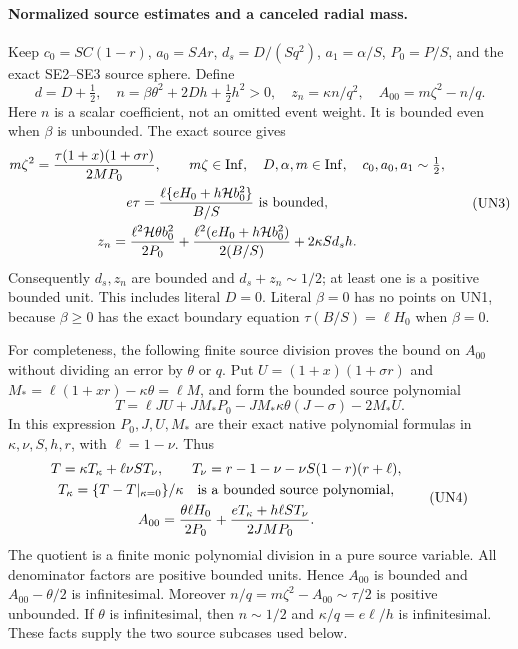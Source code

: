 \paragraph{Normalized source estimates and a canceled radial mass.}
Keep $c_0=SC(1-r)$, $a_0=SAr$, $d_s=D/(Sq^2)$,
$a_1=\alpha/S$, $P_0=P/S$, and the exact SE2--SE3 source sphere.
Define
\[
 d=D+\tfrac12,\quad
 n=\beta\theta^2+2Dh+\tfrac12h^2>0,\quad
 z_n=\kappa n/q^2,\quad A_{00}=m\zeta^2-n/q.
 \tag{UN2}
\]
Here $n$ is a scalar coefficient, not an omitted event weight.
It is bounded even when $\beta$ is unbounded. The exact source gives
\[
\begin{gathered}
 m\zeta^2=\frac{\tau(1+x)(1+\sigma r)}{2MP_0},\qquad
 m\zeta\in\operatorname{Inf},\quad D,\alpha,m\in\operatorname{Inf},\quad
 c_0,a_0,a_1\sim\tfrac12,\\
 e\tau=\frac{\ell\{eH_0+h\mathcal H b_0^2\}}{B/S}\ \hbox{is bounded},\\
 z_n=\frac{\ell^2\mathcal H\theta b_0^2}{2P_0}
 +\frac{\ell^2(eH_0+h\mathcal H b_0^2)}{2(B/S)}
 +2\kappa S d_s h.
\end{gathered}\tag{UN3}
\]
Consequently $d_s,z_n$ are bounded and
$d_s+z_n\sim1/2$; at least one is a positive bounded unit. This
includes literal $D=0$. Literal $\beta=0$ has no points on UN1,
because $\beta\ge0$ has the exact boundary equation
$\tau(B/S)=\ell H_0$ when $\beta=0$.

For completeness, the following finite source division proves the
bound on $A_{00}$ without dividing an error by $\theta$ or $q$.
Put $U=(1+x)(1+\sigma r)$ and
$M_*=\ell(1+xr)-\kappa\theta=\ell M$, and form the bounded
source polynomial
\[
 T=\ell JU+JM_*P_0-JM_*\kappa\theta(J-\sigma)-2M_*U.
\]
In this expression $P_0,J,U,M_*$ are their exact native polynomial
formulas in $\kappa,\nu,S,h,r$, with $\ell=1-\nu$. Thus
\[
\begin{gathered}
 T=\kappa T_\kappa+\ell\nu S T_\nu,\qquad
 T_\nu=r-1-\nu-\nu S(1-r)(r+\ell),\\
 T_\kappa=\{T-T|_{\kappa=0}\}/\kappa
             \quad\hbox{is a bounded source polynomial},\\
 A_{00}=\frac{\theta\ell H_0}{2P_0}
            +\frac{eT_\kappa+h\ell S T_\nu}{2JMP_0}.
\end{gathered}\tag{UN4}
\]
The quotient is a finite monic polynomial division in a pure source
variable. All denominator factors are positive bounded units.
Hence $A_{00}$ is bounded and $A_{00}-\theta/2$ is infinitesimal.
Moreover $n/q=m\zeta^2-A_{00}\sim\tau/2$ is positive unbounded.
If $\theta$ is infinitesimal, then $n\sim1/2$ and
$\kappa/q=e\ell/h$ is infinitesimal. These facts supply the two
source subcases used below.


